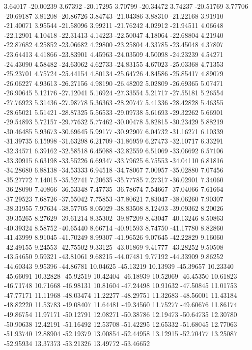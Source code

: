 {3.64017 -20.00239
3.67392 -20.17295
3.70799 -20.34472
3.74237 -20.51769
3.77706 -20.69187
3.81208 -20.86726
3.84743 -21.04386
3.88310 -21.22168
3.91910 -21.40071
3.95544 -21.58096
3.99211 -21.76242
4.02912 -21.94511
4.06648 -22.12901
4.10418 -22.31413
4.14223 -22.50047
4.18064 -22.68804
4.21940 -22.87682
4.25852 -23.06682
4.29800 -23.25804
4.33785 -23.45048
4.37807 -23.64413
4.41866 -23.83901
4.45963 -24.03509
4.50098 -24.23239
4.54271 -24.43090
4.58482 -24.63062
4.62733 -24.83155
4.67023 -25.03368
4.71353 -25.23701
4.75724 -25.44154
4.80134 -25.64726
4.84586 -25.85417
4.89079 -26.06227
4.93613 -26.27156
4.98190 -26.48202
5.02809 -26.69365
5.07471 -26.90645
5.12176 -27.12041
5.16924 -27.33554
5.21717 -27.55181
5.26554 -27.76923
5.31436 -27.98778
5.36363 -28.20747
5.41336 -28.42828
5.46355 -28.65021
5.51421 -28.87325
5.56533 -29.09738
5.61693 -29.32262
5.66901 -29.54893
5.72157 -29.77632
5.77462 -30.00478
5.82815 -30.23429
5.88219 -30.46485
5.93673 -30.69645
5.99177 -30.92907
6.04732 -31.16271
6.10339 -31.39735
6.15998 -31.63298
6.21709 -31.86959
6.27473 -32.10717
6.33291 -32.34571
6.39162 -32.58518
6.45088 -32.82559
6.51069 -33.06692
6.57106 -33.30915
6.63198 -33.55226
6.69347 -33.79625
6.75553 -34.04110
6.81816 -34.28680
6.88138 -34.53333
6.94518 -34.78067
7.00957 -35.02880
7.07456 -35.27772
7.14015 -35.52741
7.20635 -35.77785
7.27317 -36.02901
7.34060 -36.28090
7.40866 -36.53348
7.47735 -36.78674
7.54667 -37.04066
7.61664 -37.29523
7.68726 -37.55042
7.75853 -37.80621
7.83047 -38.06260
7.90307 -38.31955
7.97634 -38.57705
8.05029 -38.83508
8.12493 -39.09362
8.20026 -39.35265
8.27629 -39.61214
8.35302 -39.87209
8.43047 -40.13246
8.50863 -40.39324
8.58752 -40.65440
8.66714 -40.91593
8.74750 -41.17780
8.82860 -41.43999
8.91045 -41.70249
8.99307 -41.96526
9.07645 -42.22829
9.16060 -42.49155
9.24553 -42.75502
9.33125 -43.01869
9.41777 -43.28252
9.50508 -43.54650
9.59321 -43.81061
9.68215 -44.07481
9.77192 -44.33909
9.86252 -44.60343
9.95396 -44.86781
10.04625 -45.13219
10.13939 -45.39657
10.23340 -45.66091
10.32828 -45.92519
10.42404 -46.18939
10.52069 -46.45350
10.61823 -46.71748
10.71668 -46.98131
10.81604 -47.24498
10.91632 -47.50845
11.01753 -47.77171
11.11968 -48.03474
11.22277 -48.29751
11.32683 -48.56001
11.43184 -48.82220
11.53783 -49.08407
11.64481 -49.34560
11.75277 -49.60676
11.86174 -49.86754
11.97171 -50.12791
12.08271 -50.38786
12.19473 -50.64735
12.30780 -50.90638
12.42191 -51.16492
12.53708 -51.42295
12.65332 -51.68045
12.77063 -51.93740
12.88904 -52.19379
13.00854 -52.44958
13.12915 -52.70477
13.25087 -52.95934
13.37373 -53.21326
13.49772 -53.46652
}
